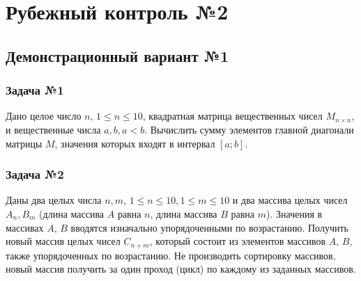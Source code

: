 \documentclass[12pt,a5paper,landscape]{article}
\begin{document}
\parindent=1cm
\pagestyle{empty}



\clearpage
\section*{Рубежный контроль №2}
\subsection*{Демонстрационный вариант №1}
\subsubsection*{Задача №1}
Дано целое число $n$, $1 \le n \le 10$, квадратная матрица вещественных чисел $M_{n \times n}$, и вещественные числа $a, b, a < b$.
Вычислить сумму элементов главной диагонали матрицы $M$, значения которых входят в интервал $[a; b]$.
\subsubsection*{Задача №2}
Даны два целых числа $n, m$, $1 \le n \le 10, 1 \le m \le 10$ и два массива целых чисел $A_{n}, B_{m}$ (длина массива $A$ равна $n$, длина массива $B$ равна $m$). Значения в массивах $A$, $B$ вводятся изначально упорядоченными по возрастанию.
Получить новый массив целых чисел $C_{n+m}$, который состоит из элементов массивов $A$, $B$, также упорядоченных по возрастанию.
Не производить сортировку массивов, новый массив получить за один проход (цикл) по каждому из заданных массивов.
\end{document}
